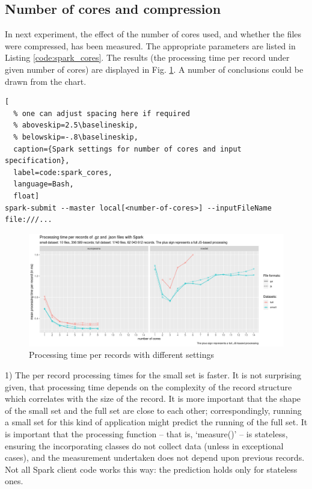 \subsection{Number of cores and compression}

In next experiment, the effect of the number of cores used, and whether the files were compressed, has been measured. The appropriate parameters are listed in Listing \ref{code:spark_cores}. The results (the processing time per record under given number of cores) are displayed in Fig. \ref{small-and-full-measurements-two-servers}. A number of conclusions could be drawn from the chart.

\begin{lstlisting}[
  % one can adjust spacing here if required
  % aboveskip=2.5\baselineskip,
  % belowskip=-.8\baselineskip,
  caption={Spark settings for number of cores and input specification},
  label=code:spark_cores,
  language=Bash,
  float]
spark-submit --master local[<number-of-cores>] --inputFileName file:///...
\end{lstlisting}

\begin{figure}
\includegraphics[width=\textwidth]{images/chapter06/small-and-full-measurements-two-servers.png}
\caption{Processing time per records with different settings}
\label{small-and-full-measurements-two-servers}
\end{figure}

1) The per record processing times for the small set is faster. It is not surprising given, that processing time depends on the complexity of the record structure which correlates with the size of the record. It is more important that the shape of the small set and the full set are close to each other; correspondingly, running a small set for this kind of application might predict the running of the full set. It is important that the processing function -- that is, `measure()' -- is stateless, ensuring the incorporating classes do not collect data (unless in exceptional cases), and the measurement undertaken does not depend upon previous records. Not all Spark client code works this way: the prediction holds only for stateless ones.

